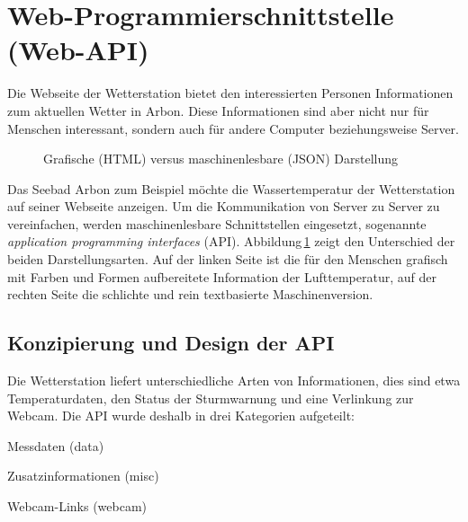 \section{ Web-Programmierschnittstelle (Web-API)}
Die Webseite der Wetterstation bietet den interessierten Personen Informationen zum aktuellen Wetter in Arbon. Diese Informationen sind aber nicht nur für Menschen interessant, sondern auch für andere Computer beziehungsweise Server.

\begin{figure}[h!]
	\centering
	\caption{Grafische (HTML) versus maschinenlesbare (JSON) Darstellung}
	\label{img:humanvsmachine}
\end{figure}


\noindent
Das Seebad Arbon zum Beispiel möchte die Wassertemperatur der Wetterstation auf seiner Webseite anzeigen. Um die Kommunikation von Server zu Server zu vereinfachen, werden maschinenlesbare Schnittstellen eingesetzt, sogenannte \emph{application programming interfaces} (API). Abbildung\,\ref{img:humanvsmachine} zeigt den Unterschied der beiden Darstellungsarten. Auf der linken Seite ist die für den Menschen grafisch mit Farben und Formen aufbereitete Information der Lufttemperatur, auf der rechten Seite die schlichte und rein textbasierte Maschinenversion.



\subsection{Konzipierung und Design der API}
Die Wetterstation liefert unterschiedliche Arten von Informationen, dies sind etwa Temperaturdaten, den Status der Sturmwarnung und eine Verlinkung zur Webcam. Die API wurde deshalb in drei Kategorien aufgeteilt:

\begin{itemize*}
\item Messdaten (data)
\item Zusatzinformationen (misc)
\item Webcam-Links (webcam)
\end{itemize*}


